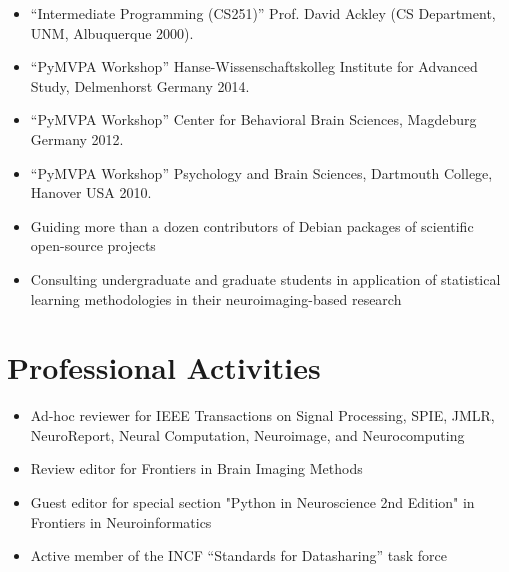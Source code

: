 \documentclass[12pt,overlapped,line]{res}
\newcommand{\mtitle}[1]{``#1''}
\newcommand{\mauthors}[1]{ \textit{#1.}}
\newcommand{\mwhere}[1]{#1.}
\begin{document}
\begin{resume}
\begin{description}[parsep=0.2em,leftmargin=1em]
\item[Teaching Assistant:]\hspace*{\fill}
  \begin{itemize}
  \item
    \mtitle{Intermediate Programming (CS251)}
    \mwhere{Prof. David Ackley (CS Department, UNM, Albuquerque 2000)}
  \end{itemize}
\item[Workshops Lecturer:]\hspace*{\fill}
  \begin{itemize}
  \item
    \mtitle{PyMVPA Workshop}
    \mwhere{Hanse-Wissenschaftskolleg Institute for Advanced Study, Delmenhorst Germany 2014}
  \item
    \mtitle{PyMVPA Workshop}
    \mwhere{Center for Behavioral Brain Sciences, Magdeburg Germany 2012}
  \item
    \mtitle{PyMVPA Workshop}
    \mwhere{Psychology and Brain Sciences, Dartmouth College, Hanover USA 2010}
  \end{itemize}
\item[Mentor:]  \hspace*{\fill}
  \begin{itemize}
  \item Guiding more than a dozen contributors of Debian packages
    of scientific open-source projects
  \item Consulting undergraduate and graduate students in
    application of statistical learning methodologies in their
    neuroimaging-based research
  \end{itemize}
\end{description}

\section{Professional Activities}
\begin{itemize}
\item Ad-hoc reviewer for IEEE Transactions on Signal Processing,
  SPIE, JMLR, NeuroReport, Neural Computation, Neuroimage, and Neurocomputing
\item Review editor for Frontiers in Brain Imaging Methods
\item Guest editor for special section "Python in Neuroscience
  2nd Edition" in Frontiers in Neuroinformatics
\item Active member of the INCF ``Standards for Datasharing'' task force
\end{itemize}



\end{resume}
\end{document}
